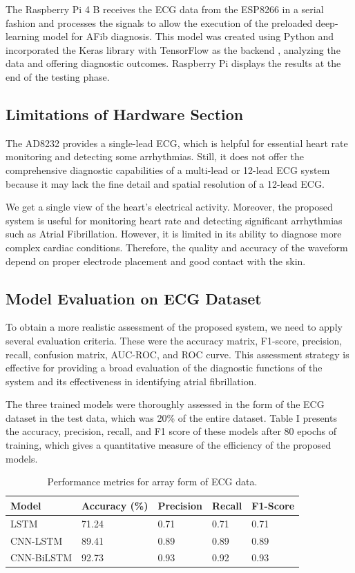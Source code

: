 \documentclass[conference]{IEEEtran}
\begin{document}
The Raspberry Pi 4 B receives the ECG data from the ESP8266 in a serial fashion and processes the signals to allow the execution of the preloaded deep-learning model for AFib diagnosis. This model was created using Python and incorporated the Keras library with TensorFlow as the backend \cite{ahsanuzzaman2020low}, analyzing the data and offering diagnostic outcomes. Raspberry Pi displays the results at the end of the testing phase.

\subsection{Limitations of Hardware Section}

The AD8232 provides a single-lead ECG, which is helpful for essential heart rate monitoring and detecting some arrhythmias. Still, it does not offer the comprehensive diagnostic capabilities of a multi-lead or 12-lead ECG system because it may lack the fine detail and spatial resolution of a 12-lead ECG.

We get a single view of the heart’s electrical activity. Moreover, the proposed system is useful for monitoring heart rate and detecting significant arrhythmias such as Atrial Fibrillation. However, it is limited in its ability to diagnose more complex cardiac conditions. Therefore, the quality and accuracy of the waveform depend on proper electrode placement and good contact with the skin.


\subsection{Model Evaluation on ECG Dataset}

To obtain a more realistic assessment of the proposed system, we need to apply several evaluation criteria. These were the accuracy matrix, F1-score, precision, recall, confusion matrix, AUC-ROC, and ROC curve. This assessment strategy is effective for providing a broad evaluation of the diagnostic functions of the system and its effectiveness in identifying atrial fibrillation.

The three trained models were thoroughly assessed in the form of the ECG dataset in the test data, which was 20\% of the entire dataset. Table I presents the accuracy, precision, recall, and F1 score of these models after 80 epochs of training, which gives a quantitative measure of the efficiency of the proposed models.

\begin{table}[!ht]
\centering
\caption{Performance metrics for array form of ECG data.}
\label{tab:array_ecg}
\begin{tabularx}{\columnwidth}{|X|X|X|X|X|}
\hline
Model & Accuracy (\%) & Precision & Recall & F1-Score \\
\hline
LSTM & 71.24 & 0.71 & 0.71 & 0.71 \\
\hline
CNN-LSTM & 89.41 & 0.89 & 0.89 & 0.89 \\
\hline
CNN-BiLSTM & 92.73 & 0.93 & 0.92 & 0.93 \\
\hline
\end{tabularx}
\end{table}
\end{document}
